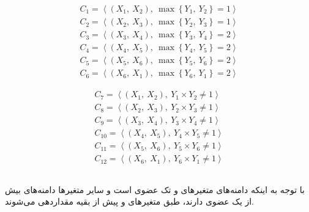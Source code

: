 \documentclass{article}
\begin{document}
\begin{fleqn}
\begin{equation}
\begin{aligned}
C_{1} = \left\langle \left( X_{1},\: X_{2} \right),\: \max\left\{ Y_{1},\: Y_{2} \right\} = 1 \right\rangle \\
C_{2} = \left\langle \left( X_{2},\: X_{3} \right),\: \max\left\{ Y_{2},\: Y_{3} \right\} = 1 \right\rangle \\
C_{3} = \left\langle \left( X_{3},\: X_{4} \right),\: \max\left\{ Y_{3},\: Y_{4} \right\} = 2 \right\rangle \\
C_{4} = \left\langle \left( X_{4},\: X_{5} \right),\: \max\left\{ Y_{4},\: Y_{5} \right\} = 2 \right\rangle \\
C_{5} = \left\langle \left( X_{5},\: X_{6} \right),\: \max\left\{ Y_{5},\: Y_{6} \right\} = 2 \right\rangle \\
C_{6} = \left\langle \left( X_{6},\: X_{1} \right),\: \max\left\{ Y_{6},\: Y_{1} \right\} = 2 \right\rangle
\end{aligned}
\end{equation}

\begin{equation}
\begin{aligned}
C_{7} = \left\langle \left( X_{1},\: X_{2} \right),\: Y_{1} \times Y_{2} \neq 1 \right\rangle \\
C_{8} = \left\langle \left( X_{2},\: X_{3} \right),\: Y_{2} \times Y_{3} \neq 1 \right\rangle \\
C_{9} = \left\langle \left( X_{3},\: X_{4} \right),\: Y_{3} \times Y_{4} \neq 1 \right\rangle \\
C_{10} = \left\langle \left( X_{4},\: X_{5} \right),\: Y_{4} \times Y_{5} \neq 1 \right\rangle \\
C_{11} = \left\langle \left( X_{5},\: X_{6} \right),\: Y_{5} \times Y_{6} \neq 1 \right\rangle \\
C_{12} = \left\langle \left( X_{6},\: X_{1} \right),\: Y_{6} \times Y_{1} \neq 1 \right\rangle
\end{aligned}
\end{equation}
\end{fleqn}







\subsection{}%
\subsection{}%
با توجه به اینکه دامنه‌های متغیرهای  و  تک عضوی است و سایر متغیرها دامنه‌های بیش از یک عضوی دارند، طبق  متغیرهای  و  پیش از بقیه مقداردهی می‌شوند.
\end{document}
